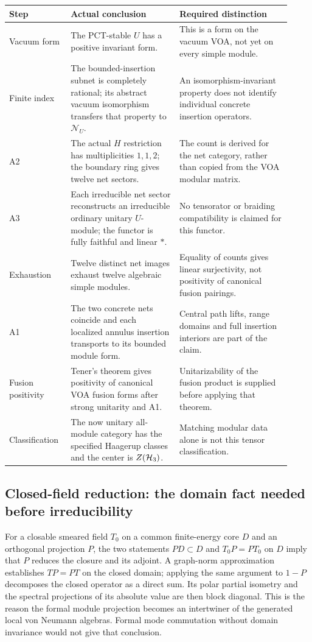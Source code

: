 \begin{longtable}{@{}p{0.19\linewidth}p{0.36\linewidth}p{0.37\linewidth}@{}}
\toprule
Step&Actual conclusion&Required distinction\\
\midrule\endhead
Vacuum form&The PCT-stable $U$ has a positive invariant form.&This
is a form on the vacuum VOA, not yet on every simple module.\\
Finite index&The bounded-insertion subnet is completely rational;
its abstract vacuum isomorphism transfers that property to
$\mathcal N_U$.&An isomorphism-invariant property does not identify
individual concrete insertion operators.\\
A2&The actual $H$ restriction has multiplicities $1,1,2$; the
boundary ring gives twelve net sectors.&The count is derived for
the net category, rather than copied from the VOA modular matrix.\\
A3&Each irreducible net sector reconstructs an irreducible ordinary
unitary $U$-module; the functor is fully faithful and linear $*$.&No
tensorator or braiding compatibility is claimed for this functor.\\
Exhaustion&Twelve distinct net images exhaust twelve algebraic
simple modules.&Equality of counts gives linear surjectivity,
not positivity of canonical fusion pairings.\\
A1&The two concrete nets coincide and each localized annulus
insertion transports to its bounded module form.&Central path lifts,
range domains and full insertion interiors are part of the claim.\\
Fusion positivity&Tener's theorem gives positivity of canonical
VOA fusion forms after strong unitarity and A1.&Unitarizability of
the fusion product is supplied before applying that theorem.\\
Classification&The now unitary all-module category has the
specified Haagerup classes and the center is $Z(\mathcal H_3)$.&Matching
modular data alone is not this tensor classification.\\
\bottomrule
\end{longtable}

\subsection{Closed-field reduction: the domain fact needed before irreducibility}

For a closable smeared field $T_0$ on a common finite-energy core
$D$ and an orthogonal projection $P$, the two statements
$PD\subset D$ and $T_0P=PT_0$ on $D$ imply that $P$ reduces
the closure and its adjoint. A graph-norm approximation establishes
$TP=PT$ on the closed domain; applying the same argument to
$1-P$ decomposes the closed operator as a direct sum. Its polar
partial isometry and the spectral projections of its absolute
value are then block diagonal. This is the reason the formal
module projection becomes an intertwiner of the generated local
von Neumann algebras. Formal mode commutation without domain
invariance would not give that conclusion.

